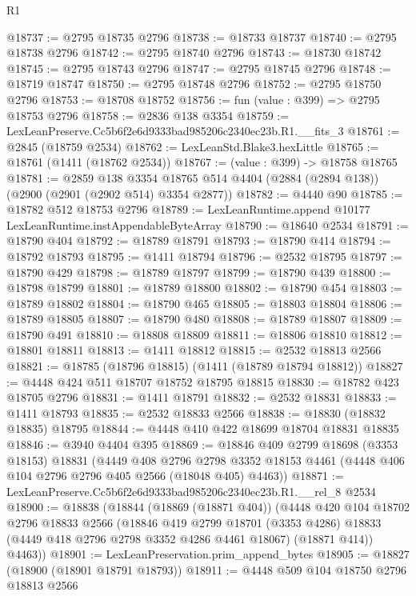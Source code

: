 \begin{lexlean}{R1}
\begin{coremodule}
@18737 := @2795 @18735 @2796
@18738 := @18733 @18737
@18740 := @2795 @18738 @2796
@18742 := @2795 @18740 @2796
@18743 := @18730 @18742
@18745 := @2795 @18743 @2796
@18747 := @2795 @18745 @2796
@18748 := @18719 @18747
@18750 := @2795 @18748 @2796
@18752 := @2795 @18750 @2796
@18753 := @18708 @18752
@18756 := fun (value : @399) => @2795 @18753 @2796
@18758 := @2836 @138 @3354
@18759 := LexLeanPreserve.Cc5b6f2e6d9333bad985206c2340ec23b.R1.__fits_3
@18761 := @2845 (@18759 @2534)
@18762 := LexLeanStd.Blake3.hexLittle
@18765 := @18761 (@1411 (@18762 @2534))
@18767 := (value : @399) -> @18758 @18765
@18781 := @2859
    @138
    @3354
    @18765
    @514
    @4404
    (@2884 (@2894 @138))
    (@2900 (@2901 (@2902 @514) @3354 @2877))
@18782 := @4440 @90
@18785 := @18782 @512 @18753 @2796
@18789 := LexLeanRuntime.append @10177 LexLeanRuntime.instAppendableByteArray
@18790 := @18640 @2534
@18791 := @18790 @404
@18792 := @18789 @18791
@18793 := @18790 @414
@18794 := @18792 @18793
@18795 := @1411 @18794
@18796 := @2532 @18795
@18797 := @18790 @429
@18798 := @18789 @18797
@18799 := @18790 @439
@18800 := @18798 @18799
@18801 := @18789 @18800
@18802 := @18790 @454
@18803 := @18789 @18802
@18804 := @18790 @465
@18805 := @18803 @18804
@18806 := @18789 @18805
@18807 := @18790 @480
@18808 := @18789 @18807
@18809 := @18790 @491
@18810 := @18808 @18809
@18811 := @18806 @18810
@18812 := @18801 @18811
@18813 := @1411 @18812
@18815 := @2532 @18813 @2566
@18821 := @18785 (@18796 @18815) (@1411 (@18789 @18794 @18812))
@18827 := @4448 @424 @511 @18707 @18752 @18795 @18815
@18830 := @18782 @423 @18705 @2796
@18831 := @1411 @18791
@18832 := @2532 @18831
@18833 := @1411 @18793
@18835 := @2532 @18833 @2566
@18838 := @18830 (@18832 @18835) @18795
@18844 := @4448 @410 @422 @18699 @18704 @18831 @18835
@18846 := @3940 @4404 @395
@18869 := @18846
    @409
    @2799
    @18698
    (@3353 @18153)
    @18831
    (@4449
      @408
      @2796
      @2798
      @3352
      @18153
      @4461
      (@4448 @406 @104 @2796 @2796 @405 @2566 (@18048 @405) @4463))
@18871 := LexLeanPreserve.Cc5b6f2e6d9333bad985206c2340ec23b.R1.__rel_8 @2534
@18900 := @18838
    (@18844
      (@18869 (@18871 @404))
      (@4448
        @420
        @104
        @18702
        @2796
        @18833
        @2566
        (@18846
          @419
          @2799
          @18701
          (@3353 @4286)
          @18833
          (@4449 @418 @2796 @2798 @3352 @4286 @4461 @18067)
          (@18871 @414))
        @4463))
@18901 := LexLeanPreservation.prim_append_bytes
@18905 := @18827 (@18900 (@18901 @18791 @18793))
@18911 := @4448 @509 @104 @18750 @2796 @18813 @2566

\end{coremodule}
\end{lexlean}
